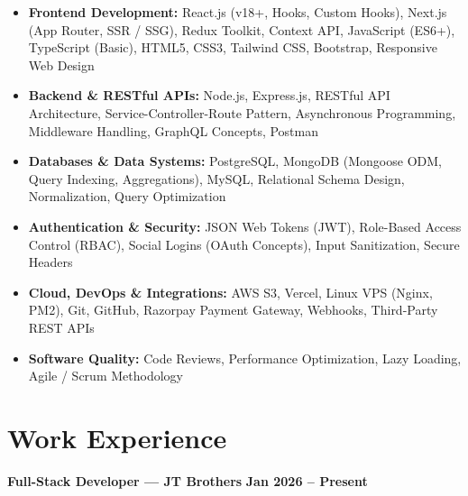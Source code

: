 \documentclass[a4paper,10pt]{article}
\begin{document}
\begin{itemize}

    \item \textbf{Frontend Development:}
    React.js (v18+, Hooks, Custom Hooks), Next.js (App Router, SSR / SSG),
    Redux Toolkit, Context API, JavaScript (ES6+), TypeScript (Basic),
    HTML5, CSS3, Tailwind CSS, Bootstrap, Responsive Web Design

    \item \textbf{Backend \& RESTful APIs:}
    Node.js, Express.js, RESTful API Architecture, Service-Controller-Route Pattern,
    Asynchronous Programming, Middleware Handling, GraphQL Concepts, Postman

    \item \textbf{Databases \& Data Systems:}
    PostgreSQL, MongoDB (Mongoose ODM, Query Indexing, Aggregations),
    MySQL, Relational Schema Design, Normalization, Query Optimization

    \item \textbf{Authentication \& Security:}
    JSON Web Tokens (JWT), Role-Based Access Control (RBAC),
    Social Logins (OAuth Concepts), Input Sanitization, Secure Headers

    \item \textbf{Cloud, DevOps \& Integrations:}
    AWS S3, Vercel, Linux VPS (Nginx, PM2), Git, GitHub,
    Razorpay Payment Gateway, Webhooks, Third-Party REST APIs

    \item \textbf{Software Quality:}
    Code Reviews, Performance Optimization, Lazy Loading, Agile / Scrum Methodology

\end{itemize}

\section*{Work Experience}

\textbf{Full-Stack Developer --- JT Brothers}
\hfill
\textbf{Jan 2026 -- Present}
\end{document}
